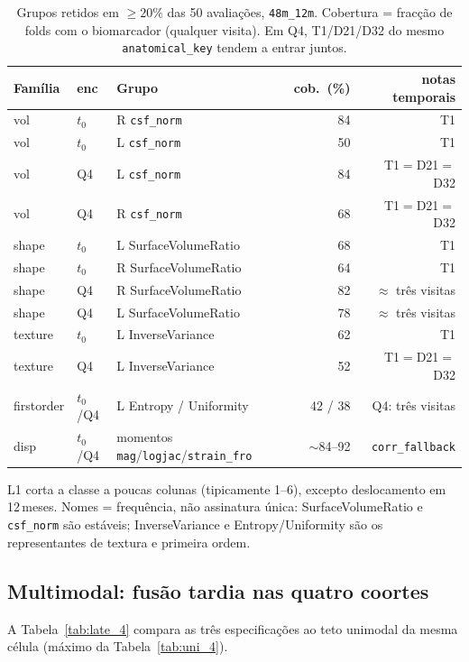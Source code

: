 \documentclass[review]{elsarticle}
\newcommand{\code}[1]{\texttt{#1}}
\begin{document}
\begin{table}[htbp]
\centering
\footnotesize
\caption{Grupos retidos em $\ge 20\%$ das 50 avaliações, \code{48m\_12m}.
Cobertura = fracção de folds com o biomarcador (qualquer visita).
Em Q4, T1/D21/D32 do mesmo \code{anatomical\_key} tendem a entrar juntos.}
\label{tab:feat_claim}
\begin{tabular}{lllrr}
\toprule
Família & enc & Grupo & cob.\ (\%) & notas temporais \\
\midrule
vol & $t_0$ & R \code{csf\_norm} & 84 & T1 \\
vol & $t_0$ & L \code{csf\_norm} & 50 & T1 \\
vol & Q4 & L \code{csf\_norm} & 84 & T1$=$D21$=$D32 \\
vol & Q4 & R \code{csf\_norm} & 68 & T1$=$D21$=$D32 \\
shape & $t_0$ & L SurfaceVolumeRatio & 68 & T1 \\
shape & $t_0$ & R SurfaceVolumeRatio & 64 & T1 \\
shape & Q4 & R SurfaceVolumeRatio & 82 & $\approx$ três visitas \\
shape & Q4 & L SurfaceVolumeRatio & 78 & $\approx$ três visitas \\
texture & $t_0$ & L InverseVariance & 62 & T1 \\
texture & Q4 & L InverseVariance & 52 & T1$=$D21$=$D32 \\
firstorder & $t_0$/Q4 & L Entropy / Uniformity & 42 / 38 & Q4: três visitas \\
disp & $t_0$/Q4 & momentos \code{mag}/\code{logjac}/\code{strain\_fro} & $\sim$84--92 & \code{corr\_fallback} \\
\bottomrule
\end{tabular}
\end{table}

L1 corta a classe a poucas colunas (tipicamente 1--6), excepto deslocamento em 12\,meses.
Nomes = frequência, não assinatura única: SurfaceVolumeRatio e \code{csf\_norm} são estáveis; InverseVariance e Entropy/Uniformity são os representantes de textura e primeira ordem.

\subsection{Multimodal: fusão tardia nas quatro coortes}
\label{subsec:multimodal}

A Tabela~\ref{tab:late_4} compara as três especificações ao teto unimodal da mesma célula (máximo da Tabela~\ref{tab:uni_4}).
\end{document}
